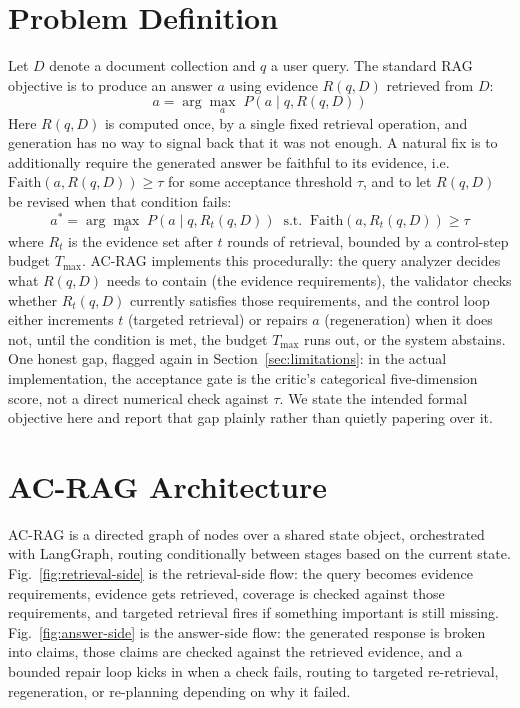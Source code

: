 \documentclass[conference]{IEEEtran}
\begin{document}
\section{Problem Definition}
\label{sec:problem}

Let $D$ denote a document collection and $q$ a user query. The standard RAG objective
is to produce an answer $a$ using evidence $R(q, D)$ retrieved from $D$:
\begin{equation}
a = \arg\max_a \; P(a \mid q, R(q, D))
\end{equation}
Here $R(q, D)$ is computed once, by a single fixed retrieval operation, and generation
has no way to signal back that it was not enough. A natural fix is to additionally
require the generated answer be faithful to its evidence, i.e.\
$\mathrm{Faith}(a, R(q, D)) \geq \tau$ for some acceptance threshold $\tau$, and to let
$R(q, D)$ be revised when that condition fails:
\begin{equation}
a^{*} = \arg\max_a \; P(a \mid q, R_t(q, D)) \;\; \text{s.t.}\;\; \mathrm{Faith}(a, R_t(q, D)) \geq \tau
\end{equation}
where $R_t$ is the evidence set after $t$ rounds of retrieval, bounded by a control-step
budget $T_{\max}$. AC-RAG implements this procedurally: the query analyzer decides what
$R(q, D)$ needs to contain (the evidence requirements), the validator checks whether
$R_t(q, D)$ currently satisfies those requirements, and the control loop either
increments $t$ (targeted retrieval) or repairs $a$ (regeneration) when it does not,
until the condition is met, the budget $T_{\max}$ runs out, or the system abstains. One
honest gap, flagged again in Section~\ref{sec:limitations}: in the actual
implementation, the acceptance gate is the critic's categorical five-dimension score,
not a direct numerical check against $\tau$. We state the intended formal objective
here and report that gap plainly rather than quietly papering over it.

\section{AC-RAG Architecture}
\label{sec:architecture}

AC-RAG is a directed graph of nodes over a shared state object, orchestrated with
LangGraph, routing conditionally between stages based on the current state.
Fig.~\ref{fig:retrieval-side} is the retrieval-side flow: the query becomes evidence
requirements, evidence gets retrieved, coverage is checked against those requirements,
and targeted retrieval fires if something important is still missing.
Fig.~\ref{fig:answer-side} is the answer-side flow: the generated response is broken
into claims, those claims are checked against the retrieved evidence, and a bounded
repair loop kicks in when a check fails, routing to targeted re-retrieval,
regeneration, or re-planning depending on why it failed.
\end{document}
